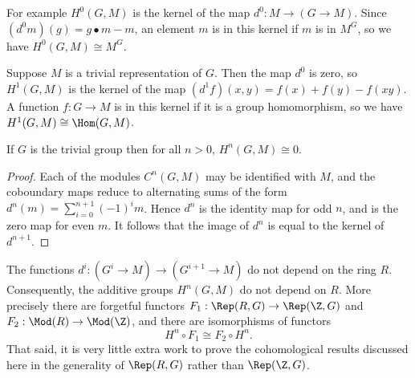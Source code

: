 \begin{example} \label{eg:H0}
	For example $H^0(G,M)$ is the kernel of the map $d^0 : M \to (G \to M)$.
	Since $(d^0m)(g) = g \bullet m - m$, an element $m$ is in this kernel if $m$ is in $M^G$,
	so we have $H^0(G,M) \cong M^G$.
\end{example}

\begin{example} \label{eg:H1 trivial iso Hom}
	Suppose $M$ is a trivial representation of $G$. Then the map $d^0$ is zero,
	so $H^1(G,M)$ is the kernel of the map $(d^1f)(x,y) = f(x) + f(y) - f(xy)$.
	A function $f: G \to M$ is in this kernel if it is a group homomorphism, so we have
	$H^1(G,M) \cong \Hom(G,M)$.
\end{example}

\begin{lemma} \label{lem:Hn unit}
	\leanok
	If $G$ is the trivial group then for all $n>0$, $H^n(G,M)\cong 0$.
\end{lemma}

\begin{proof}
	\leanok
	Each of the modules $C^n(G,M)$ may be identified with $M$,
	and the coboundary maps reduce to alternating sums of the form
	$d^n(m) = \sum_{i=0}^{n+1} (-1)^i m$.
	Hence $d^n$ is the identity map for odd $n$, and is the zero map for even $m$.
	It follows that the image of $d^n$ is equal to the kernel of $d^{n+1}$.
\end{proof}

\begin{remark}
	The functions $d^i : (G^i \to M) \to (G^{i+1} \to M)$ do not depend on the
	ring $R$. Consequently, the additive groups $H^n(G,M)$ do not depend on $R$.
	More precisely there are forgetful functors $F_1 : \Rep(R,G) \to \Rep(\Z,G)$
	and $F_2 : \Mod(R) \to \Mod(\Z)$, and there are isomorphisms of functors
	\[
		H^n \circ F_1 \cong F_2 \circ H^n.
	\]
	That said, it is very little extra work to prove the cohomological results
	discussed here in the generality of $\Rep(R,G)$ rather than $\Rep(\Z,G)$.
\end{remark}

